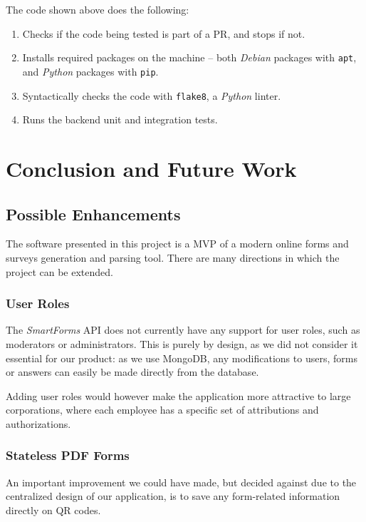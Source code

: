 \documentclass[11pt, a4paper]{report}
\def\code#1{\texttt{#1}}
\begin{document}
The code shown above does the following:
\begin{enumerate}
	\item Checks if the code being tested is part of a PR, and stops if not. 
	\item Installs required packages on the machine -- both \textit{Debian} packages with \code{apt}, and \textit{Python} packages with \code{pip}.
	\item Syntactically checks the code with \code{flake8}, a \textit{Python} linter.
	\item Runs the backend unit and integration tests.
\end{enumerate}

\chapter{Conclusion and Future Work}
\label{chapter-conclusions-future-work}

\section{Possible Enhancements}

The software presented in this project is a MVP of a modern online forms and surveys generation and parsing tool. There are many directions in which the project can be extended.

\subsection{User Roles}

The \textit{SmartForms} API does not currently have any support for user roles, such as moderators or administrators. This is purely by design, as we did not consider it essential for our product: as we use MongoDB, any modifications to users, forms or answers can easily be made directly from the database.

Adding user roles would however make the application more attractive to large corporations, where each employee has a specific set of attributions and authorizations.

\subsection{Stateless PDF Forms}

An important improvement we could have made, but decided against due to the centralized design of our application, is to save any form-related information directly on QR codes.
\end{document}
